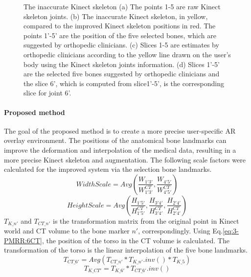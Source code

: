 \begin{figure}
{	}
	\quad
	\caption{The inaccurate Kinect skeleton (a) The points 1-5 are raw Kinect skeleton joints. (b) The inaccurate Kinect skeleton, in yellow, compared to the improved Kinect skeleton positions in red. The points 1'-5' are the position of the five selected bones, which are suggested by orthopedic clinicians. (c) Slices 1-5 are estimates by  orthopedic clinicians according to the yellow line drawn on the user's body using the Kinect skeleton joints information. (d) Slices 1'-5' are the selected five bones suggested by orthopedic clinicians and the slice 6', which is computed from slice1'-5', is the corresponding slice for joint 6'.}
	\label{fig:3-PRMM:5Joints}
\end{figure} 
\paragraph{Proposed method} The goal of the proposed method is to create a more precise user-specific AR overlay environment. The positions of the anatomical bone landmarks can improve the deformation and interpolation of the medical data, resulting in a more precise Kinect skeleton and augmentation. The following scale factors were calculated for the improved system via the selection bone landmarks. 
\begin{equation}
WidthScale = Avg(\frac{{{W_{1'3'}}}}{{W_{1'3'}^{CT}}},\frac{{{W_{4'5'}}}}{{W_{4'5'}^{CT}}})
\end{equation}
\begin{equation}
HeightScale = Avg(\frac{{{H_{1'5'}}}}{{H_{1'5'}^{CT}}},\frac{{{H_{3'4'}}}}{{H_{3'4'}^{CT}}},\frac{{{H_{2'4'}}}}{{H_{2'4'}^{CT}}})
\end{equation}
$T_{K\_n'}$ and $T_{CT\_n'}$ is the transformation matrix from the original point in Kinect world and CT volume to the bone marker $n'$, correspondingly. Using Eq.\ref{eq:3-PMRR:6CT}, the position of the torso in the CT volume is calculated. The transformation of the torso is the linear interpolation of the five bone landmarks.
\begin{equation} \label{eq:3-PMRR:6CT}
T_{CT\_6'} = Avg(T_{CT\_n'} * T_{K\_n'}.inv() * T_{K\_5 })
\end{equation}
\begin{equation}
T_{K\_CT'} = T_{K\_6'} * T_{CT\_6'}.inv()
\end{equation}

